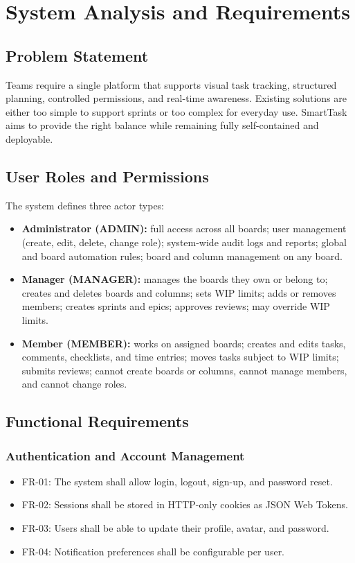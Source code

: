 \documentclass[12pt,a4paper]{report}
\begin{document}
\chapter{System Analysis and Requirements}
\label{ch:analysis}

\section{Problem Statement}
Teams require a single platform that supports visual task tracking, structured
planning, controlled permissions, and real-time awareness. Existing solutions are
either too simple to support sprints or too complex for everyday use. SmartTask
aims to provide the right balance while remaining fully self-contained and
deployable.

\section{User Roles and Permissions}
The system defines three actor types:
\begin{itemize}
  \item \textbf{Administrator (ADMIN):} full access across all boards; user
        management (create, edit, delete, change role); system-wide audit logs and
        reports; global and board automation rules; board and column management on
        any board.
  \item \textbf{Manager (MANAGER):} manages the boards they own or belong to;
        creates and deletes boards and columns; sets WIP limits; adds or removes
        members; creates sprints and epics; approves reviews; may override WIP
        limits.
  \item \textbf{Member (MEMBER):} works on assigned boards; creates and edits
        tasks, comments, checklists, and time entries; moves tasks subject to WIP
        limits; submits reviews; cannot create boards or columns, cannot manage
        members, and cannot change roles.
\end{itemize}

\section{Functional Requirements}
\subsection{Authentication and Account Management}
\begin{itemize}
  \item FR-01: The system shall allow login, logout, sign-up, and password reset.
  \item FR-02: Sessions shall be stored in HTTP-only cookies as JSON Web Tokens.
  \item FR-03: Users shall be able to update their profile, avatar, and password.
  \item FR-04: Notification preferences shall be configurable per user.
\end{itemize}
\end{document}
